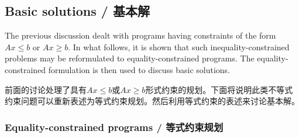 \subsection{Basic solutions / 基本解}

\begin{original}
The previous discussion dealt with programs having constraints of the form $Ax \le b$ or $Ax \ge b$. In what follows, it is shown that such inequality-constrained problems may be reformulated to equality-constrained programs. The equality-constrained formulation is then used to discuss basic solutions.
\end{original}
\begin{translation}
前面的讨论处理了具有$Ax \le b$或$Ax \ge b$形式约束的规划。下面将说明此类不等式约束问题可以重新表述为等式约束规划。然后利用等式约束的表述来讨论基本解。
\end{translation}

\subsubsection{Equality-constrained programs / 等式约束规划}

